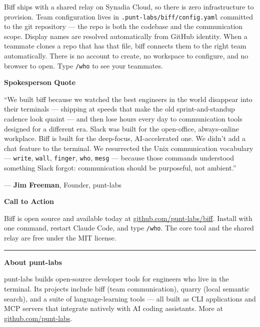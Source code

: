 \documentclass[11pt,letterpaper]{article}
\newcommand{\prsection}[1]{%
  \vspace{1em}%
  {\large\bfseries\color{SectionBlue}#1}%
  \vspace{0.3em}\par%
}
\begin{document}
Biff ships with a shared relay on Synadia Cloud, so there is zero
infrastructure to provision. Team configuration lives in \texttt{.punt-labs/biff/config.yaml}
committed to the git repository --- the repo is both the codebase and
the communication scope. Display names are resolved automatically from
GitHub identity. When a teammate clones a repo that has that file, biff
connects them to the right team automatically. There is no
account to create, no workspace to configure, and no browser to open. Type
\texttt{/who} to see your teammates.

\prsection{Spokesperson Quote}

\begin{spokespersonquote}
``We built biff because we watched the best engineers in the world
disappear into their terminals --- shipping at speeds that make the old
sprint-and-standup cadence look quaint --- and then lose hours every day to
communication tools designed for a different era. Slack was built for the
open-office, always-online workplace. Biff is built for the deep-focus,
AI-accelerated one. We didn't add a chat feature to the terminal. We
resurrected the Unix communication vocabulary --- \texttt{write},
\texttt{wall}, \texttt{finger}, \texttt{who}, \texttt{mesg} --- because
those commands understood something Slack forgot: communication should be
purposeful, not ambient.''

\raggedleft --- \textbf{Jim Freeman}, Founder, punt-labs
\end{spokespersonquote}

\prsection{Call to Action}

Biff is open source and available today at
\href{https://github.com/punt-labs/biff}{github.com/punt-labs/biff}.
Install with one command, restart Claude Code, and type \texttt{/who}. The
core tool and the shared relay are free under the MIT license.

\vspace{2em}
\noindent\rule{\textwidth}{0.4pt}
\vspace{0.5em}

\noindent\textbf{About punt-labs}

\noindent punt-labs builds open-source developer tools for engineers who
live in the terminal. Its projects include biff (team communication),
quarry (local semantic search), and a suite of language-learning tools ---
all built as CLI applications and MCP servers that integrate natively with
AI coding assistants. More at
\href{https://github.com/punt-labs}{github.com/punt-labs}.
\end{document}
